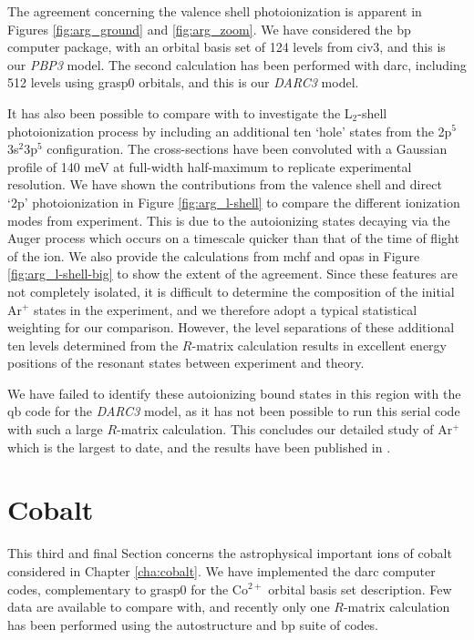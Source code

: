 The agreement concerning the valence shell photoionization is apparent in Figures \ref{fig:arg_ground} and \ref{fig:arg_zoom}. We have considered the {\sc bp} computer package, with an orbital basis set of 124 levels from {\sc civ3}, and this is our \textit{PBP3} model. The second calculation has been performed with {\sc darc}, including 512 levels using {\sc grasp0} orbitals, and this is our \textit{DARC3} model. 

It has also been possible to compare with \citet{2012PhRvA..85d3408B} to investigate the L$_2$-shell photoionization process by including an additional ten `hole' states from the 2p$^5$3s$^2$3p$^5$ configuration. The cross-sections have been convoluted with a Gaussian profile of 140 meV at full-width half-maximum to replicate experimental resolution. We have shown the contributions from the valence shell and direct `2p' photoionization in Figure \ref{fig:arg_l-shell} to compare the different ionization modes from experiment. This is due to the autoionizing states decaying via the Auger process which occurs on a timescale quicker than that of the time of flight of the ion. We also provide the calculations from {\sc mchf} and {\sc opas} in Figure \ref{fig:arg_l-shell-big} to show the extent of the agreement. Since these features are not completely isolated, it is difficult to determine the composition of the initial Ar$^+$ states in the experiment, and we therefore adopt a typical statistical weighting for our comparison. However, the level separations of these additional ten levels determined from the $R$-matrix calculation results in excellent energy positions of the resonant states between experiment and theory.

We have failed to identify these autoionizing bound states in this region with the {\sc qb} code for the \textit{DARC3} model, as it has not been possible to run this serial code with such a large $R$-matrix calculation. This concludes our detailed study of Ar$^+$ which is the largest to date, and the results have been published in \citet{2016MNRAS.456..366T}.

\section{Cobalt}
This third and final Section concerns the astrophysical important ions of cobalt considered in Chapter \ref{cha:cobalt}. We have implemented the {\sc darc} computer codes, complementary to {\sc grasp0} for the Co$^{2+}$ orbital basis set description. Few data are available to compare with, and recently only one $R$-matrix calculation has been performed using the {\sc autostructure} and {\sc bp} suite of codes.

